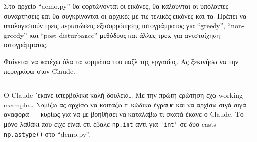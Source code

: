 \documentclass{article}
\begin{document}
Στο αρχείο ``demo.py'' θα φορτώνονται οι εικόνες, θα καλούνται οι υπόλοιπες
συναρτήσεις και θα συγκρίνονται οι αρχικές με τις τελικές εικόνες και τα. Πρέπει 
να υπολογιστούν τρεις περιπτώσεις εξισορρόπησης ιστογράμματος για 
``greedy'', ``non-greedy'' και ``post-disturbance'' μεθόδους και άλλες τρεις
για αντστοίχηση ιστογράμματος.

Φαίνεται να κατέχω όλα τα κομμάτια του παζλ της εργασίας. Ας ξεκινήσω να την 
περιγράφω στον Claude.

\vspace{1em}
\hrule
\vspace{1em}

Ο Claude ᾽εκανε υπερβολικά καλή δουλειά\ldots{} Με την πρώτη ερώτηση έχω 
working example\ldots{} Νομίζω ας αρχίσω να κοιτάζω τι κώδικα έγραψε και να 
αρχίσω σιγά σιγά αναφορά --- κυρίως για να με βοηθήσει να καταλάβω τι σκατά έκανε 
ο Claude. Το μόνο λαθάκι που είχε είναι ότι έβαλε \verb|np.int| αντί για 
\verb|'int'| σε δύο casts \verb|np.astype()| στο ``demo.py''.
\end{document}

